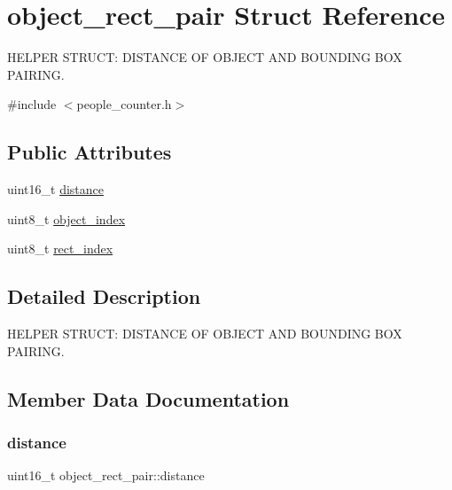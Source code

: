 \hypertarget{structobject__rect__pair}{}\section{object\+\_\+rect\+\_\+pair Struct Reference}
\label{structobject__rect__pair}


H\+E\+L\+P\+ER S\+T\+R\+U\+CT\+: D\+I\+S\+T\+A\+N\+CE OF O\+B\+J\+E\+CT A\+ND B\+O\+U\+N\+D\+I\+NG B\+OX P\+A\+I\+R\+I\+NG.  




{\ttfamily \#include $<$people\+\_\+counter.\+h$>$}

\subsection*{Public Attributes}
\begin{DoxyCompactItemize}
\item 
uint16\+\_\+t \mbox{\hyperlink{structobject__rect__pair_a75cd4374e35df9fc24a8abc3cdb8d264}{distance}}
\item 
uint8\+\_\+t \mbox{\hyperlink{structobject__rect__pair_a6e1fad724b69c75cb7702a545c1b8715}{object\+\_\+index}}
\item 
uint8\+\_\+t \mbox{\hyperlink{structobject__rect__pair_ac89984c58c0f4309ff2a5cb75a6bc18a}{rect\+\_\+index}}
\end{DoxyCompactItemize}


\subsection{Detailed Description}
H\+E\+L\+P\+ER S\+T\+R\+U\+CT\+: D\+I\+S\+T\+A\+N\+CE OF O\+B\+J\+E\+CT A\+ND B\+O\+U\+N\+D\+I\+NG B\+OX P\+A\+I\+R\+I\+NG. 



\subsection{Member Data Documentation}
\mbox{\label{structobject__rect__pair_a75cd4374e35df9fc24a8abc3cdb8d264}} 
\subsubsection{\texorpdfstring{distance}{distance}}
{\footnotesize\ttfamily uint16\+\_\+t object\+\_\+rect\+\_\+pair\+::distance}

